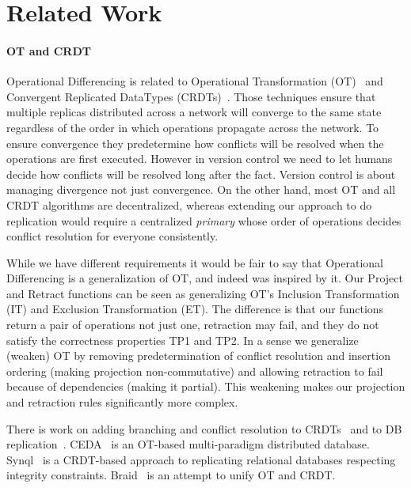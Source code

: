 \documentclass[english,submission]{programming}
\theoremstyle{definition}
\newcommand{\myparagraph}[1]{\vspace{-8pt}\paragraph{#1}}
\begin{document}



\section{Related Work}

\myparagraph{OT and CRDT}

Operational Differencing is related to
Operational Transformation (OT)~\cite{ceda-ot, Ellis89, Ressel96, Oster06} and Convergent Replicated DataTypes (CRDTs)~\cite{Shapiro11}.
Those techniques ensure that multiple replicas distributed across a network will converge to the same state regardless of the order in which operations propagate across the network. To ensure convergence they predetermine how conflicts will be resolved when the operations are first executed. However in version control we need to let humans decide how conflicts will be resolved long after the fact. Version control is about managing divergence not just convergence. On the other hand, most OT and all CRDT algorithms are decentralized, whereas extending our approach to do replication would require a centralized \textit{primary} whose order of operations decides conflict resolution for everyone consistently.

While we have different requirements it would be fair to say that Operational Differencing is a generalization of OT, and indeed was inspired by it. Our Project and Retract functions can be seen as generalizing OT's Inclusion Transformation (IT) and Exclusion Transformation (ET). The difference is that our functions return a pair of operations not just one, retraction may fail, and they do not satisfy the correctness properties TP1 and TP2. In a sense we generalize (weaken) OT by removing predetermination of conflict resolution and insertion ordering (making projection non-commutative) and allowing retraction to fail because of dependencies (making it partial). This weakening makes our projection and retraction rules significantly more complex.

There is work on adding branching and conflict resolution to CRDTs~\cite{patchwork, automerge-conflicts} and to DB replication~\cite{couchdb-conflicts}.
CEDA~\cite{ceda} is an OT-based multi-paradigm distributed database.
Synql~\cite{ignat-synql} is a CRDT-based approach to replicating relational databases respecting integrity constraints. Braid~\cite{braid} is an attempt to unify OT and CRDT.
\end{document}
